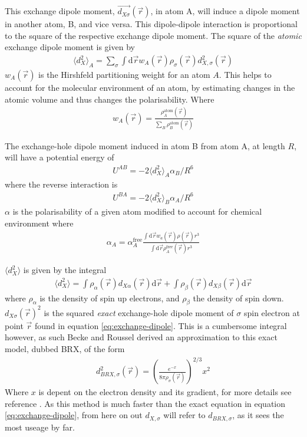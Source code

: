 \documentclass[10pt,a4paper,twocolumn,twoside]{extarticle}
\renewcommand{\d}{\text{d}}
\begin{document}
	This exchange dipole moment, $\vec{d_{X\sigma}}(\vec{r})$, in atom A, will induce a dipole moment in another atom, B, and vice versa. This dipole-dipole interaction is proportional to the square of the respective exchange dipole moment. The square of the \emph{atomic} exchange dipole moment is given by
	\begin{align}
		\langle d_{X}^2 \rangle_A = \sum_\sigma \int \d\vec{r} w_A(\vec{r}) \rho_\sigma(\vec{r}) d_{X,\sigma}^2(\vec{r})
	\end{align}
	$w_A(\vec{r})$ is the Hirshfeld partitioning\cite{Hirshfeld} weight for an atom $A$. This helps to account for the molecular environment of an atom, by estimating changes in the atomic volume and thus changes the polarisability. 
	Where 
	\begin{align}
		w_A(\vec{r}) = \frac{\rho_A^\text{atom}(\vec{r})}{\sum_B\rho_B^\text{atom}(\vec{r})}
	\end{align}

	The exchange-hole dipole moment induced in atom B from atom A, at length $R$, will have a potential energy of 
	\begin{align}
		U^{AB} = -2\langle d_X^2 \rangle_A \alpha_B / R^6
	\end{align} 
	where the reverse interaction is  
	\begin{align}
		U^{BA} = -2\langle d_X^2 \rangle_B \alpha_A / R^6
	\end{align} 
	$\alpha$ is the polarisability of a given atom modified to account for chemical environment where
	\begin{align}
		\alpha_A = \alpha_A^\text{free} \frac{\int\d\vec{r} w_a(\vec{r})\rho(\vec{r})r^3}{\int \d\vec{r}\rho_A^\text{free}(\vec{r})r^3}
	\end{align}
	
	
	$\langle d_X^2 \rangle$ is given by the integral
	\begin{align}
		\langle d_X^2 \rangle = \int \rho_\alpha(\vec{r}) d_{X\alpha}(\vec{r}) \d \vec{r} +
								\int \rho_\beta(\vec{r}) d_{X\beta}(\vec{r}) \d \vec{r}
	\end{align}
	where $\rho_\alpha$ is the density of spin up electrons, and $\rho_\beta$ the density of spin down. $d_{X\sigma}(\vec{r})^2$ is the squared \emph{exact} exchange-hole dipole moment of $\sigma$ spin electron at point $\vec{r}$ found in equation \ref{eq:exchange-dipole}. This is a cumbersome integral however, as such Becke and Roussel derived an approximation to this exact model, dubbed BRX, of the form
	\begin{align}
		d_{BRX,\sigma}^2(\vec{r}) = \left(\frac{e^{-x}}{8\pi\rho_\sigma(\vec{r})}\right)^{2/3}x^2
	\end{align} 
	Where $x$ is depent on the electron density and its gradient, for more details see reference \cite{XDM-Original}. As this method is much faster than the exact equation in equation \ref{eq:exchange-dipole}, from here on out $d_{X,\sigma}$ will refer to $d_{BRX,\sigma}$, as it sees the most useage by far. 
\end{document}
